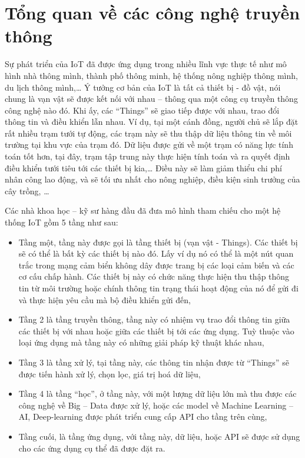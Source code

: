 \section{Tổng quan về các công nghệ truyền thông}
Sự phát triển của IoT đã được ứng dụng trong nhiều lĩnh vực thực tế như mô hình nhà thông mình, thành phố thông minh, hệ thống nông nghiệp thông mình, du lịch thông mình,… Ý tưởng cơ bản của IoT là tất cả thiết bị - đồ vật, nói chung là vạn vật sẽ được kết nối với nhau – thông qua một công cụ truyền thông công nghệ nào đó. Khi ấy, các “Things” sẽ giao tiếp được với nhau, trao đổi thông tin và điều khiển lẫn nhau. Ví dụ, tại một cánh đồng, người chủ sẽ lắp đặt rất nhiều trạm tưới tự động, các trạm này sẽ thu thập dữ liệu thông tin về môi trường tại khu vực của trạm đó. Dữ liệu được gửi về một trạm có năng lực tính toán tốt hơn, tại đây, trạm tập trung này thực hiện tính toán và ra quyết định điều khiển tưới tiêu tới các thiết bị kia,… Điều này sẽ làm giảm thiểu chi phí nhân công lao động, và sẽ tối ưu nhất cho nông nghiệp, điều kiện sinh trưởng của cây trồng, …  \par
	Các nhà khoa học – kỹ sư hàng đầu đã đưa mô hình tham chiếu cho một hệ thống IoT gồm 5 tầng như sau:
	\begin{itemize}
	\item	Tầng một, tầng này được gọi là tầng thiết bị (vạn vật - Things). Các thiết bị sẽ có thể là bất kỳ các thiết bị nào đó. Lấy ví dụ nó có thể là một nút quan trắc trong mạng cảm biển không dây được trang bị các loại cảm biến và các cơ cấu chấp hành. Các thiết bị này có chức năng thực hiện thu thập thông tin từ môi trường hoặc chính thông tin trạng thái hoạt động của nó để gửi đi và thực hiện yêu cầu mà bộ điều khiển gửi đến,
\item	Tầng 2 là tầng truyền thông, tầng này có nhiệm vụ trao đổi thông tin giữa các thiết bị với nhau hoặc giữa các thiết bị tới các ứng dụng. Tuỳ thuộc vào loại ứng dụng mà tầng này có những giải pháp kỹ thuật khác nhau,
\item	Tầng 3 là tầng xử lý, tại tầng này, các thông tin nhận được từ “Things” sẽ được tiến hành xử lý, chọn lọc, giá trị hoá dữ liệu,
\item	Tầng 4 là tầng “học”, ở tầng này, với một lượng dữ liệu lớn mà thu được các công nghệ về Big – Data được xử lý, hoặc các model về Machine Learning – AI, Deep-learning được phát triển cung cấp API cho tầng trên cùng,
\item	Tầng cuối, là tầng ứng dụng, với tầng này, dữ liệu, hoặc API sẽ được sử dụng cho các ứng dụng cụ thể đã được đặt ra.
	\end{itemize}
